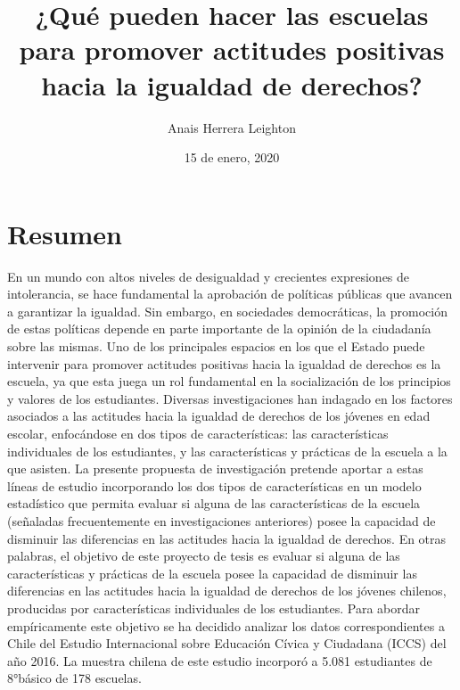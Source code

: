 \documentclass[12pt,twoside]{templates/facsothesis}
\title{¿Qué pueden hacer las escuelas para promover actitudes positivas hacia la igualdad de derechos?}
\author{Anais Herrera Leighton}
\date{15 de enero, 2020}
\begin{document}

  \maketitle

\frontmatter %
\pagestyle{empty} %



  \setcounter{tocdepth}{1}
  \setlength{\parskip}{0pt}
  \tableofcontents

\setlength\parskip{1em plus 0.1em minus 0.2em}

  \listoftables

  \listoffigures



\mainmatter %
\pagestyle{fancyplain} %

\hypertarget{resumen}{%
\chapter*{Resumen}\label{resumen}}

En un mundo con altos niveles de desigualdad y crecientes expresiones de intolerancia, se hace fundamental la aprobación de políticas públicas que avancen a garantizar la igualdad. Sin embargo, en sociedades democráticas, la promoción de estas políticas depende en parte importante de la opinión de la ciudadanía sobre las mismas. Uno de los principales espacios en los que el Estado puede intervenir para promover actitudes positivas hacia la igualdad de derechos es la escuela, ya que esta juega un rol fundamental en la socialización de los principios y valores de los estudiantes. Diversas investigaciones han indagado en los factores asociados a las actitudes hacia la igualdad de derechos de los jóvenes en edad escolar, enfocándose en dos tipos de características: las características individuales de los estudiantes, y las características y prácticas de la escuela a la que asisten. La presente propuesta de investigación pretende aportar a estas líneas de estudio incorporando los dos tipos de características en un modelo estadístico que permita evaluar si alguna de las características de la escuela (señaladas frecuentemente en investigaciones anteriores) posee la capacidad de disminuir las diferencias en las actitudes hacia la igualdad de derechos. En otras palabras, el objetivo de este proyecto de tesis es evaluar si alguna de las características y prácticas de la escuela posee la capacidad de disminuir las diferencias en las actitudes hacia la igualdad de derechos de los jóvenes chilenos, producidas por características individuales de los estudiantes. Para abordar empíricamente este objetivo se ha decidido analizar los datos correspondientes a Chile del Estudio Internacional sobre Educación Cívica y Ciudadana (ICCS) del año 2016. La muestra chilena de este estudio incorporó a 5.081 estudiantes de 8°básico de 178 escuelas.
\end{document}
